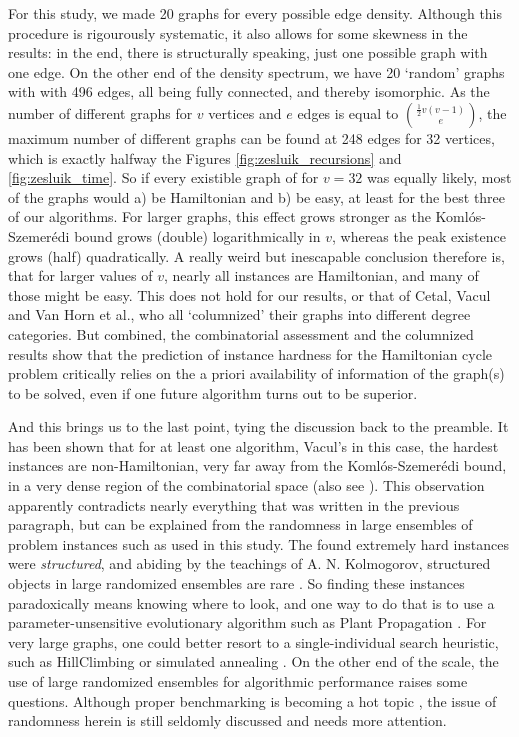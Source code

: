 \documentclass[10pt,conference,compsocconf]{IEEEtran}
\begin{document}
For this study, we made 20 graphs for every possible edge density. Although this procedure is rigourously systematic, it also allows for some skewness in the results: in the end, there is structurally speaking, just one possible graph with one edge. On the other end of the density spectrum, we have 20 `random' graphs with with 496 edges, all being fully connected, and thereby isomorphic. As the number of different graphs for $v$ vertices and $e$ edges is equal to ${\frac{1}{2} v (v-1)}\choose{e}$, the maximum number of different graphs can be found at 248 edges for 32 vertices, which is exactly halfway the Figures \ref{fig:zesluik_recursions} and \ref{fig:zesluik_time}. So if every existible graph of for $v=32$ was equally likely, most of the graphs would a) be Hamiltonian and b) be easy, at least for the best three of our algorithms. For larger graphs, this effect grows stronger as the Koml\'os-Szemer\'edi bound grows (double) logarithmically in $v$, whereas the peak existence grows (half) quadratically. A really weird but inescapable conclusion therefore is, that for larger values of $v$, nearly all instances are Hamiltonian, and many of those might be easy. This does not hold for our results, or that of Cetal, Vacul and Van Horn et al., who all `columnized' their graphs into different degree categories. But combined, the combinatorial assessment and the columnized results show that the prediction of instance hardness for the Hamiltonian cycle problem critically relies on the a priori availability of information of the graph(s) to be solved, even if one future algorithm turns out to be superior.

And this brings us to the last point, tying the discussion back to the preamble. It has been shown that for at least one algorithm, Vacul's in this case, the hardest instances are non-Hamiltonian, very far away from the Koml\'os-Szemer\'edi bound, in a very dense region of the combinatorial space \cite{Sleegers2020Looking}\cite{sleegers2020plant} (also see \cite{vandenbergAdriaans}). This observation apparently contradicts nearly everything that was written in the previous paragraph, but can be explained from the randomness in large ensembles of problem instances such as used in this study. The found extremely hard instances were \textit{structured}, and abiding by the teachings of A. N. Kolmogorov, structured objects in large randomized ensembles are rare \cite{li2008introduction}. So finding these instances paradoxically means knowing where to look, and one way to do that is to use a parameter-unsensitive evolutionary algorithm such as Plant Propagation \cite{salhi2011nature}\cite{Dejonge2020sensitivity}\cite{de2020plant}\cite{paauw2019paintings}\cite{vrielink2019fireworks}\cite{vrielink2021a}\cite{vrielink2021b}. For very large graphs, one could better resort to a single-individual search heuristic, such as HillClimbing or simulated annealing \cite{geleijn2019plant}\cite{Dahmani2020}\cite{kirkpatrick1983optimization}. On the other end of the scale, the use of large randomized ensembles for algorithmic performance raises some questions. Although proper benchmarking is becoming a hot topic \cite{bartz2020benchmarking}, the issue of randomness herein is still seldomly discussed and needs more attention.
\end{document}
